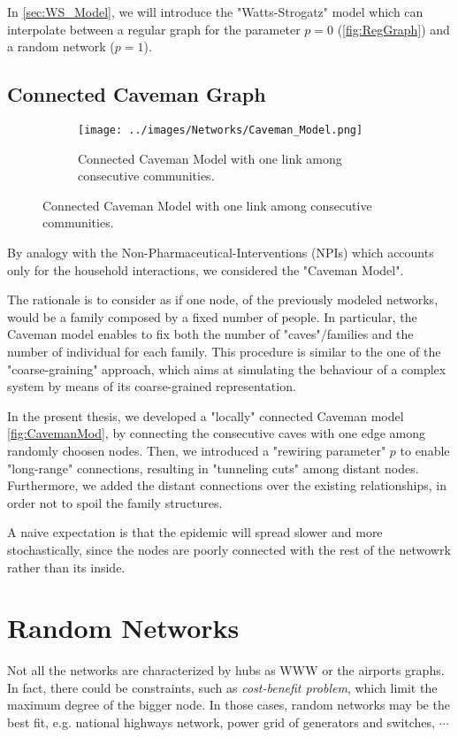 \documentclass[a4paper,10pt, oneside]{book} %
\theoremstyle{definition}
\begin{document}
In \autoref{sec:WS_Model}, we will introduce the "Watts-Strogatz" model which can interpolate between a regular graph for the parameter $p = 0$ (\autoref{fig:RegGraph}) and a random network ($p=1$).

\subsection{Connected Caveman Graph}
\begin{figure}[ht]
    \begin{subfigure}{\textwidth}
        \texttt{[image: ../images/Networks/Caveman\_Model.png]}
        \centering
        \caption{Connected Caveman Model with one link among consecutive communities.}
        \label{fig:CavemanMod}
    \end{subfigure}
\end{figure}

By analogy with the Non-Pharmaceutical-Interventions (NPIs) which accounts only for the household interactions, we considered the "Caveman Model".

The rationale is to consider as if one node, of the previously modeled networks, would be a family composed by a fixed number of people. In particular, the Caveman model enables to fix both the number of "caves"/families and the number of individual for each family. This procedure is similar to the one of the "coarse-graining" approach, which aims at simulating the behaviour of a complex system by means of its coarse-grained representation.

In the present thesis, we developed a "locally" connected Caveman model \autoref{fig:CavemanMod}, by connecting the consecutive caves with one edge among randomly choosen nodes. Then, we introduced a "rewiring parameter" $ p$ to enable "long-range" connections, resulting in "tunneling cuts" among distant nodes. Furthermore, we added the distant connections over the existing relationships, in order not to spoil the family structures.

A naive expectation is that the epidemic will spread slower and more stochastically, since the nodes are poorly connected with the rest of the netwowrk rather than its inside.

\section{Random Networks}
Not all the networks are characterized by hubs as WWW or the airports graphs.
In fact, there could be constraints, such as \textit{cost-benefit problem}, which limit the maximum degree of the bigger node. In those cases, random networks may be the best fit, e.g. national highways network, power grid of generators and switches, $\cdots$
\end{document}
